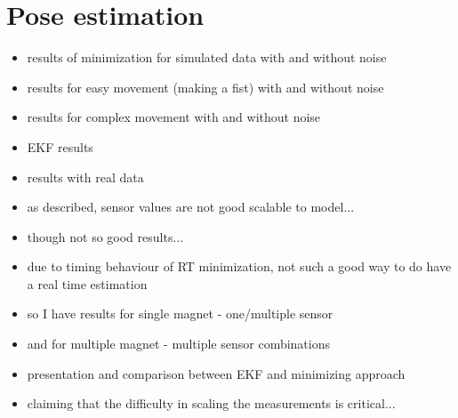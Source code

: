 \section{Pose estimation} \label{sec:estimationRes}

\begin{itemize}
\item results of minimization for simulated data with and without noise
\item results for easy movement (making a fist) with and without noise
\item results for complex movement with and without noise

\item EKF results

\item results with real data
\item as described, sensor values are not good scalable to model...
\item though not so good results...
\item due to timing behaviour of RT minimization, not such a good way to do have a real time estimation
\item so I have results for single magnet - one/multiple sensor 
\item and for multiple magnet - multiple sensor combinations
\item presentation and comparison between EKF and minimizing approach
\item claiming that the difficulty in scaling the measurements is critical...

\end{itemize}



